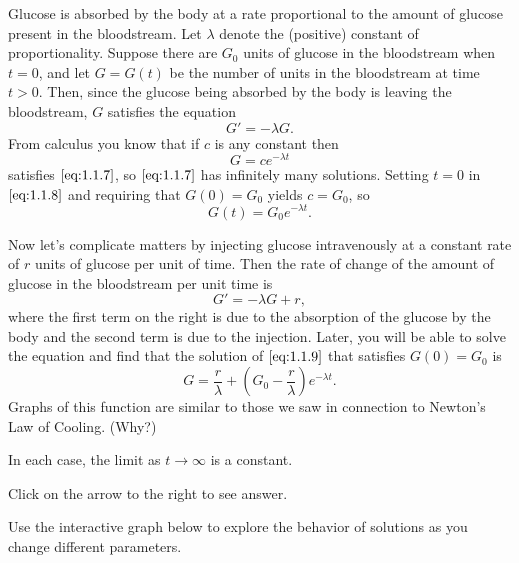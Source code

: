 \documentclass{ximera}
\begin{document}
Glucose is absorbed by
the body at a rate proportional to the amount of glucose present in
the bloodstream. Let $\lambda$ denote the (positive) constant of
proportionality. Suppose   there are $G_0$ units of glucose in
the bloodstream when $t=0$, and let $G=G(t)$ be the number of units in
the bloodstream at time $t>0$. Then, since the glucose being absorbed
by the body is leaving the bloodstream, $G$ satisfies the equation
\begin{equation} \label{eq:1.1.7}
G'=-\lambda G.
\end{equation}
From  calculus you know that if $c$ is any constant then
\begin{equation} \label{eq:1.1.8}
G=ce^{-\lambda t}
\end{equation}
satisfies $\eqref{eq:1.1.7}$, so $\eqref{eq:1.1.7}$ has infinitely
many solutions.
 Setting $t=0$ in $\eqref{eq:1.1.8}$ and requiring that
$G(0)=G_0$ yields $c=G_0$, so
$$
G(t)=G_0e^{-\lambda t}.
$$
 
Now let's complicate matters by injecting glucose intravenously
at a constant rate of $r$ units of glucose per unit of time.
Then the rate of change of the amount of glucose  in the bloodstream
per unit time is
\begin{equation} \label{eq:1.1.9}
G'=-\lambda G+r,
\end{equation}
where the first term on the right is due to the absorption of the
glucose by the body and the second term is due to the injection.
 Later,
you will be able to solve the equation and find %
that the solution
of
$\eqref{eq:1.1.9}$ that satisfies $G(0)=G_0$ is
$$
G=\frac{r}{\lambda}+\left(G_0-\frac{r}{\lambda}\right)e^{-\lambda t}.
$$
Graphs of  this function are similar to those we saw in connection to Newton's Law of Cooling.
(Why?)
 
 \begin{solution}
 In each case, the limit as $t \rightarrow \infty$ is a constant.
 \end{solution}
 
  Click on the arrow to the right to see answer.
 
 Use the interactive graph below to explore the behavior of solutions as you change different parameters.
 
\begin{center}  
\end{center}
 
 
\end{document}
